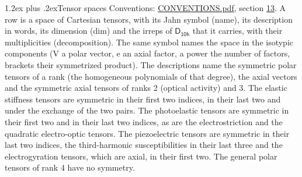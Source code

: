 \documentclass[10pt,a4paper]{article}
\makeatletter
\renewcommand\section{\@startsection{section}{1}{\z@}{-3ex plus -1ex minus -.2ex}%
  {1.2ex plus .2ex}{\normalfont\large\sffamily\bfseries\color{parttitle}}}
\numberwithin{equation}{section}
\newcommand{\grp}[1]{\mathsf{#1}}
\makeatother
\begin{document}
\section{Tensor spaces}\label{s:tensor_spaces}
Conventions: \href{../../CONVENTIONS.pdf}{CONVENTIONS.pdf}, section \href{../../CONVENTIONS.pdf\#conv.13}{13}.
\leavevmode\label{n:head.name}\label{n:head.description}\label{n:head.dim}\label{n:head.decomposition}A row is a space of Cartesian tensors, with its Jahn symbol (name), its description in words, its dimension (dim) and the irreps of $\grp{D_{10h}}$ that it carries, with their multiplicities (decomposition). \label{n:label.jahn}The same symbol names the space in the isotypic components (V a polar vector, e an axial factor, a power the number of factors, brackets their symmetrized product). The descriptions name the symmetric polar tensors of a rank (the homogeneous polynomials of that degree), the axial vectors and the symmetric axial tensors of ranks 2 (optical activity) and 3. The elastic stiffness tensors are symmetric in their first two indices, in their last two and under the exchange of the two pairs. The photoelastic tensors are symmetric in their first two and in their last two indices, as are the electrostriction and the quadratic electro-optic tensors. The piezoelectric tensors are symmetric in their last two indices, the third-harmonic susceptibilities in their last three and the electrogyration tensors, which are axial, in their first two. The general polar tensors of rank 4 have no symmetry.
\end{document}
